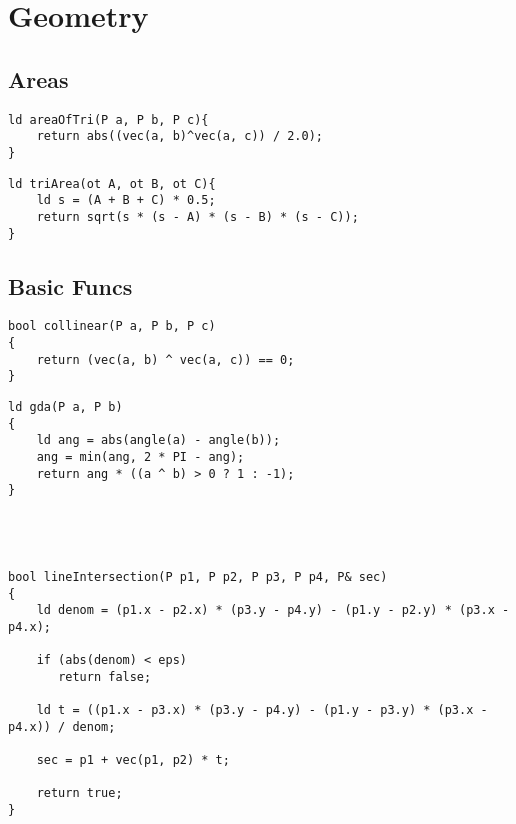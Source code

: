 \section{Geometry}

\subsection{Areas}

\begin{lstlisting}[style=cpp]
ld areaOfTri(P a, P b, P c){  
    return abs((vec(a, b)^vec(a, c)) / 2.0);  
}
\end{lstlisting}

\begin{lstlisting}[style=cpp]
ld triArea(ot A, ot B, ot C){  
    ld s = (A + B + C) * 0.5;  
    return sqrt(s * (s - A) * (s - B) * (s - C));  
}
\end{lstlisting}

\subsection{Basic Funcs}

\begin{lstlisting}[style=cpp]
bool collinear(P a, P b, P c)  
{  
    return (vec(a, b) ^ vec(a, c)) == 0;  
}
\end{lstlisting}

\begin{lstlisting}[style=cpp]
ld gda(P a, P b)  
{  
    ld ang = abs(angle(a) - angle(b));  
    ang = min(ang, 2 * PI - ang);  
    return ang * ((a ^ b) > 0 ? 1 : -1);  
}
\end{lstlisting}

\begin{lstlisting}[style=cpp]

\end{lstlisting}

\begin{lstlisting}[style=cpp]

\end{lstlisting}

\begin{lstlisting}[style=cpp]

\end{lstlisting}

\begin{lstlisting}[style=cpp]

\end{lstlisting}

\begin{lstlisting}[style=cpp]
bool lineIntersection(P p1, P p2, P p3, P p4, P& sec)  
{  
    ld denom = (p1.x - p2.x) * (p3.y - p4.y) - (p1.y - p2.y) * (p3.x -p4.x);  
  
    if (abs(denom) < eps)  
       return false;  
  
    ld t = ((p1.x - p3.x) * (p3.y - p4.y) - (p1.y - p3.y) * (p3.x - p4.x)) / denom;  
  
    sec = p1 + vec(p1, p2) * t;  
  
    return true;  
}
\end{lstlisting}

